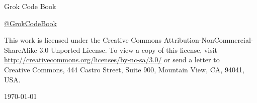 \begin{titlepage}

\begin{center}

{\LARGE Grok Code Book}

{\large \href{http://twitter.com/\#!/GrokCodeBook}{@GrokCodeBook}}

\end{center}
 
\vfill
 
{\small This work is licensed under the Creative Commons Attribution-NonCommercial-ShareAlike 3.0 Unported License. 
To view a copy of this license, visit \\
\url{http://creativecommons.org/licenses/by-nc-sa/3.0/} or send a letter to \\
Creative Commons, 444 Castro Street, Suite 900, Mountain View, CA, 94041, USA.}

\begin{center}

{\large \today}

\end{center}

\end{titlepage}

